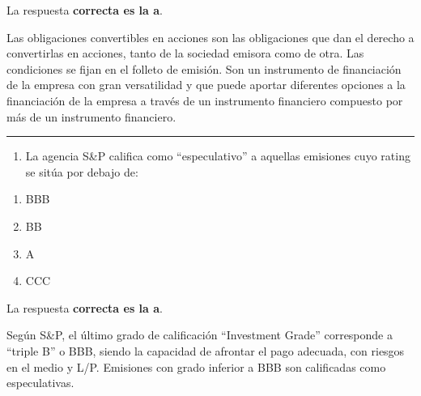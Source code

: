 \documentclass[
  letterpaper,
  DIV=11,
  numbers=noendperiod]{scrreprt}
\providecommand{\tightlist}{%
  \setlength{\itemsep}{0pt}\setlength{\parskip}{0pt}}\usepackage{longtable,booktabs,array}
\begin{document}
\begin{tcolorbox}[enhanced jigsaw, left=2mm, opacityback=0, colback=white, breakable, arc=.35mm, bottomrule=.15mm, rightrule=.15mm, toprule=.15mm, leftrule=.75mm, colframe=quarto-callout-tip-color-frame]
\begin{minipage}[t]{5.5mm}
\textcolor{quarto-callout-tip-color}{\faLightbulb}
\end{minipage}%
\begin{minipage}[t]{\textwidth - 5.5mm}

La respuesta \textbf{correcta es la a}.

Las obligaciones convertibles en acciones son las obligaciones que dan
el derecho a convertirlas en acciones, tanto de la sociedad emisora como
de otra. Las condiciones se fijan en el folleto de emisión. Son un
instrumento de financiación de la empresa con gran versatilidad y que
puede aportar diferentes opciones a la financiación de la empresa a
través de un instrumento financiero compuesto por más de un instrumento
financiero.

\end{minipage}%
\end{tcolorbox}

\begin{center}\rule{0.5\linewidth}{0.5pt}\end{center}

\begin{enumerate}
\def\labelenumi{\arabic{enumi}.}
\setcounter{enumi}{69}
\tightlist
\item
  La agencia S\&P califica como ``especulativo'' a aquellas emisiones
  cuyo rating se sitúa por debajo de:
\end{enumerate}

\begin{enumerate}
\def\labelenumi{\alph{enumi})}
\item
  BBB
\item
  BB
\item
  A
\item
  CCC
\end{enumerate}

\begin{tcolorbox}[enhanced jigsaw, left=2mm, opacityback=0, colback=white, breakable, arc=.35mm, bottomrule=.15mm, rightrule=.15mm, toprule=.15mm, leftrule=.75mm, colframe=quarto-callout-tip-color-frame]
\begin{minipage}[t]{5.5mm}
\textcolor{quarto-callout-tip-color}{\faLightbulb}
\end{minipage}%
\begin{minipage}[t]{\textwidth - 5.5mm}

La respuesta \textbf{correcta es la a}.

Según S\&P, el último grado de calificación ``Investment Grade''
corresponde a ``triple B'' o BBB, siendo la capacidad de afrontar el
pago adecuada, con riesgos en el medio y L/P. Emisiones con grado
inferior a BBB son calificadas como especulativas.

\end{minipage}%
\end{tcolorbox}
\end{document}
